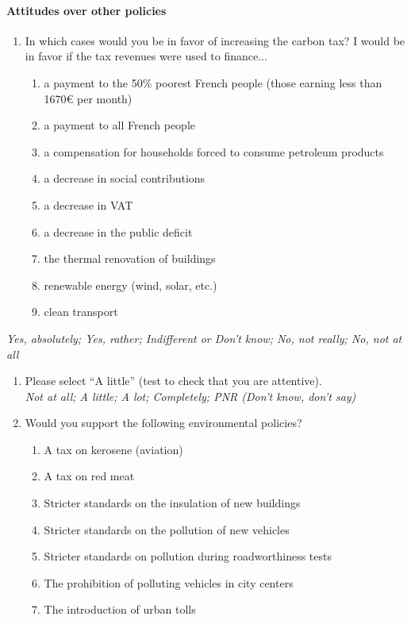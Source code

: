 \documentclass[english,5p,authoryear]{elsarticle}
\begin{document}
\begin{appendices}
\paragraph{Attitudes over other policies}
\begin{enumerate}[resume,leftmargin=*]
\item In which cases would you be in favor of increasing the carbon tax?
I would be in favor if the tax revenues were used to finance...\emph{ }
\begin{enumerate}[resume,leftmargin=*]
\item a payment to the 50\% poorest French people (those earning less than
1670\euro{} per month) 
\item a payment to all French people 
\item a compensation for households forced to consume petroleum products
\item a decrease in social contributions
\item a decrease in VAT 
\item a decrease in the public deficit 
\item the thermal renovation of buildings 
\item renewable energy (wind, solar, etc.) 
\item clean transport
\end{enumerate}
\end{enumerate}
\emph{Yes, absolutely; Yes, rather; Indifferent or Don't know; No,
not really; No, not at all}
\begin{enumerate}[resume,leftmargin=*]
\item Please select ``A little'' (test to check that you are attentive).
\emph{}\\
\emph{Not at all; A little; A lot; Completely; PNR (Don't know, don't
say)} 
\item Would you support the following environmental policies? 
\begin{enumerate}[resume,leftmargin=*]
\item A tax on kerosene (aviation) 
\item A tax on red meat 
\item Stricter standards on the insulation of new buildings 
\item Stricter standards on the pollution of new vehicles
\item Stricter standards on pollution during roadworthiness tests 
\item The prohibition of polluting vehicles in city centers 
\item The introduction of urban tolls 

\end{enumerate}
\end{enumerate}
\end{appendices}
\end{document}
